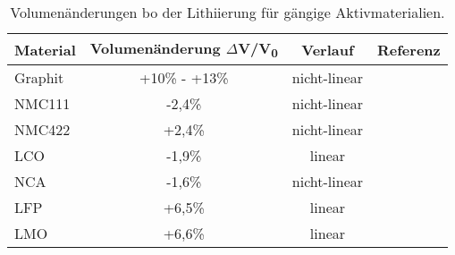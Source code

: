 \begin{table}[ht]
    \centering
    \caption{\label{tab:volume_change}Volumenänderungen bo der Lithiierung für gängige Aktivmaterialien.}
    \begin{tabular}[t]{lccc}
        \toprule
        Material& Volumenänderung $\Delta$V/V\textsubscript{0}&Verlauf&Referenz\\
        \midrule
        Graphit & +10\% - +13\% & nicht-linear & \cite{Qi2010,Woodford2012}\\
        NMC111 &-2,4\%&nicht-linear& \cite{Yabuuchi2005}\\
        NMC422 &+2,4\%&nicht-linear& \cite{Ma2007}\\
        LCO &-1,9\% & linear & \cite{Reimers1992}\\
        NCA &-1,6\% & nicht-linear& \cite{Itou2005}\\
        LFP &+6,5\% & linear & \cite{Padhi1997}\\
        LMO &+6,6\% & linear & \cite{Christensen2006}\\
        \bottomrule
    \end{tabular}
\end{table}